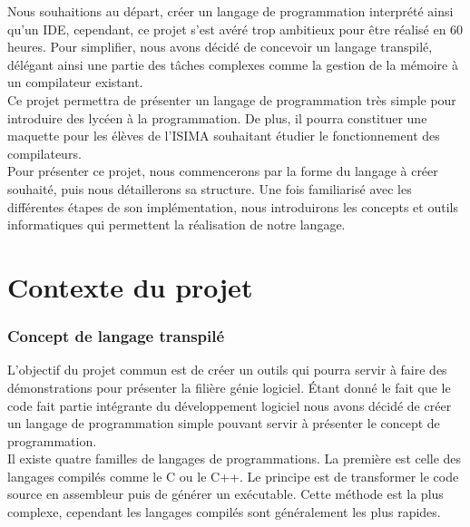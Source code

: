 \documentclass[a4paper]{article}%
\begin{document}
Nous souhaitions au départ, créer un langage de programmation interprété ainsi
qu'un IDE, cependant, ce projet s'est avéré trop ambitieux pour être réalisé en
60 heures. Pour simplifier, nous avons décidé de concevoir un langage transpilé,
délégant ainsi une partie des tâches complexes comme la gestion de la mémoire à
un compilateur existant.\\

Ce projet permettra de présenter un langage de programmation très simple pour
introduire des lycéen à la programmation. De plus, il pourra constituer une
maquette pour les élèves de l'ISIMA souhaitant étudier le fonctionnement des
compilateurs.\\

Pour présenter ce projet, nous commencerons par la forme du langage à créer
souhaité, puis nous détaillerons sa structure. Une fois familiarisé avec les
différentes étapes de son implémentation,  nous introduirons les concepts et
outils informatiques qui permettent la réalisation de notre langage.\\

\normalsize
\clearpage{}



\part{Contexte du projet}

\section{Concept de langage transpilé}

L'objectif du projet commun est de créer un outils qui pourra servir à faire des
démonstrations pour présenter la filière génie logiciel. Étant donné le fait que
le code fait partie intégrante du développement logiciel nous avons décidé de
créer un langage de programmation simple pouvant servir à présenter le concept
de programmation.\\

Il existe quatre familles de langages de programmations. La première est celle
des langages compilés comme le C ou le C++. Le principe est de transformer le
code source en assembleur puis de générer un exécutable. Cette méthode est la
plus complexe, cependant les langages compilés sont généralement les plus
rapides.
\end{document}
